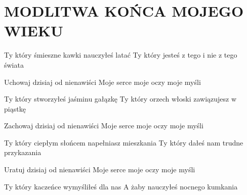 \documentclass[../../../songbook.tex]{subfiles}
\begin{document}
\TabPositions{8cm} %
\section*{MODLITWA KOŃCA MOJEGO WIEKU}
{}
\vspace{0.5cm}
Ty który śmieszne kawki 		 \newline	
nauczyłeś latać					 \newline	
Ty który jesteś z tego 			 \newline	
i nie z tego świata 			 \newline	

\-\hspace{1cm} Uchowaj dzisiaj od nienawiści 	 \newline	
\-\hspace{1cm} Moje serce moje oczy moje myśli 	  \newline	

Ty który stworzyłeś \newline
jaśminu gałązkę \newline
Ty który orzech włoski \newline
zawiązujesz w piąstkę \newline

\-\hspace{1cm} Zachowaj dzisiaj od nienawiści \newline
\-\hspace{1cm} Moje serce moje oczy moje myśli \newline

Ty który ciepłym słońcem \newline
napełniasz mieszkania \newline
Ty który dałeś nam \newline
trudne przykazania \newline

\-\hspace{1cm} Uratuj dzisiaj od nienawiści \newline
\-\hspace{1cm} Moje serce moje oczy moje myśli \newline

Ty który kaczeńce \newline
wymyśliłeś dla nas \newline
A żaby nauczyłeś \newline
nocnego kumkania \newline
\end{document}

